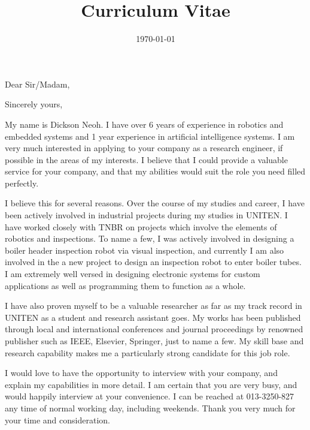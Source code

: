 \documentclass[11pt,a4paper,sans]{moderncv} %
\title{Curriculum Vitae}
\begin{document}


\clearpage

\date{\today} %
\opening{Dear Sir/Madam,} %
\closing{Sincerely yours,} %

\makelettertitle %

My name is Dickson Neoh. I have over 6 years of experience in robotics and embedded systems and 1 year experience in artificial intelligence systems. I am very much interested in applying to your company as a research engineer, if possible in the areas of my interests. I believe that I could provide a valuable service for your company, and that my abilities would suit the role you need filled perfectly.

I believe this for several reasons. Over the course of my studies and career, I have been actively involved in industrial projects during my studies in UNITEN. I have worked closely with TNBR on projects which involve the elements of robotics and inspections. To name a few, I was actively involved in designing a boiler header inspection robot via visual inspection, and currently I am also involved in the a new project to design an inspection robot to enter boiler tubes. I am extremely well versed in designing electronic systems for custom applications as well as programming them to function as a whole.

I have also proven myself to be a valuable researcher as far as my track record in UNITEN as a student and research assistant goes. My works has been published through local and international conferences and journal proceedings by renowned publisher such as IEEE, Elsevier, Springer, just to name a few. 
My skill base and research capability makes me a particularly strong candidate for this job role. 

I would love to have the opportunity to interview with your company, and explain my capabilities in more detail. I am certain that you are very busy, and would happily interview at your convenience. I can be reached at 013-3250-827 any time of normal working day, including weekends. Thank you very much for your time and consideration.
\end{document}
